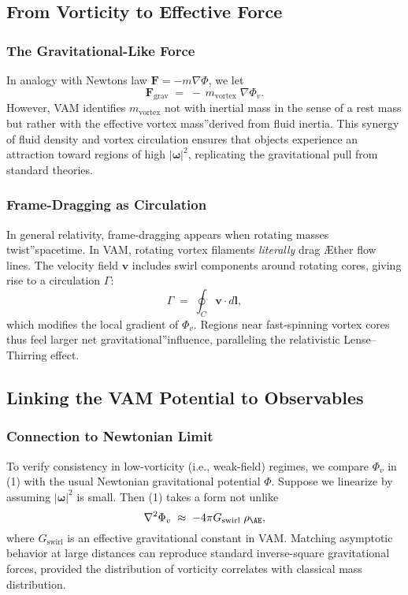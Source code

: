 \subsection{From Vorticity to Effective Force}
\subsubsection{The Gravitational-Like Force}

In analogy with Newton\rqs s law \(\mathbf{F} = -m \nabla \Phi\), we let
\[
    \mathbf{F}_{\mathrm{grav}} \;=\; -\,m_{\mathrm{vortex}}\;\nabla \Phi_v.
\]
However, VAM identifies \(m_{\mathrm{vortex}}\) not with inertial mass in the sense of a rest mass but rather with the effective vortex \grqq mass\textquotedblright derived from fluid inertia. This synergy of fluid density and vortex circulation ensures that objects experience an attraction toward regions of high \(\lvert \boldsymbol{\omega} \rvert^2\), replicating the gravitational pull from standard theories.

\subsubsection{Frame-Dragging as Circulation}

In general relativity, frame-dragging appears when rotating masses \grqq twist\textquotedblright spacetime. In VAM, rotating vortex filaments \textit{literally} drag Æther flow lines. The velocity field \(\mathbf{v}\) includes swirl components around rotating cores, giving rise to a circulation \(\Gamma\):
\[
    \Gamma \;=\; \oint_C \mathbf{v}\cdot d\mathbf{l},
\]
which modifies the local gradient of \(\Phi_v\). Regions near fast-spinning vortex cores thus feel larger net \grqq gravitational\textquotedblright influence, paralleling the relativistic Lense–Thirring effect.

\subsection{Linking the VAM Potential to Observables}

\subsubsection{Connection to Newtonian Limit}

To verify consistency in low-vorticity (i.e., weak-field) regimes, we compare \(\Phi_v\) in (1) with the usual Newtonian gravitational potential \(\Phi\). Suppose we linearize by assuming \(\lvert \boldsymbol{\omega} \rvert^2\) is small. Then (1) takes a form not unlike
\[
    \nabla^2 \Phi_v \;\approx\; -4\pi G_{\mathrm{swirl}}\;\rho_{\mathrm{\AE}},
\]
where \(G_{\mathrm{swirl}}\) is an effective gravitational constant in VAM. Matching asymptotic behavior at large distances can reproduce standard inverse-square gravitational forces, provided the distribution of vorticity correlates with classical mass distribution.

